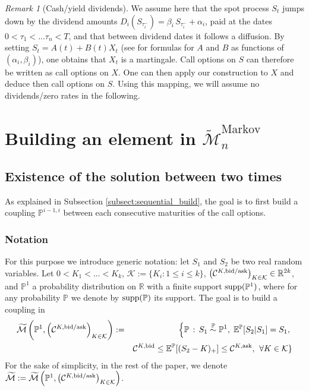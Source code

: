 \documentclass{amsart}%
\def \P{{\mathbb P}}
\def \R{\mathbb{R}}
\def\Cc{{\cal C}}
\def\Kc{{\cal K}}
\def\no{\noindent}
\theoremstyle{definition}
\theoremstyle{remark}
\newtheorem{rem}[thm]{Remark}
\newcommand{\PP}{\mathbb{P}}
\newcommand{\beaa}{\begin{eqnarray*}}
\newcommand{\eeaa}{\end{eqnarray*}}
\newcommand{\EE}{{\mathbb E}}
\newcommand{\cal}{\mathcal}
\begin{document}
\begin{rem}[Cash/yield dividends] \label{div} \no We assume here that the spot process $S_t$ jumps down by the dividend amounts $D_i(S_{\tau_i^-}) = \beta_i \,S_{\tau_i^-}+\alpha_i$, paid at the dates $0 < \tau_1 < \dots \tau_n < T$, and that between dividend dates it follows a diffusion. By setting $S_t=A(t)+B(t)X_t$ (see \cite{henry2009calibration} for formulas for $A$  and $B$ as  functions of $(\alpha_i,\beta_i)$), one obtains that $X_t$ is a martingale.  Call options on $S$ can therefore be written as call options on $X$. One can then apply our construction to $X$  and deduce then call options on $S$. Using this mapping, we will assume no dividends/zero rates in the following.
\end{rem}


\section{Building an element in $\widetilde{\cal M}^\mathrm{Markov}_n$}\label{sect:m-markov}

\subsection{Existence of the solution between two times}

\no As explained in Subsection \ref{subsect:sequential_build}, the goal is to first build a coupling $\P^{i-1,i}$ between each consecutive maturities of the call options.

\subsubsection{Notation}

For this purpose we introduce generic notation: let $S_1$ and $S_2$ be two real random variables. Let $0<K_1<...<K_k$, $\Kc:=\{K_i:1\le i \le k\}$, $\left(\Cc^{K,{\rm bid/ask}}\right)_{K\in\Kc}\in \R^{2k}$, and $\P^1$ a probability distribution on $\R$ with a finite support ${\rm supp}(\P^1)$, where for any probability $\P$ we denote by ${\rm supp}(\P)$ its support. The goal is to build a coupling in
\beaa 
\widetilde{\cal M}\left(\P^1,\left(\Cc^{K,{\rm bid/ask}}\right)_{K\in\Kc}\right)&:=&\left\{\PP \, : \, S_1 \overset{\PP}{\sim} \PP^1,\; \EE^\PP[S_{2}|S_{1}]=S_{1},\right.\\
&&\Cc^{K,\mathrm{bid}} \leq \EE^\PP[(S_{2}-K)_+] \leq \Cc^{K,\mathrm{ask}}, \;\left. \forall K \in {\cal K}\right\}
\eeaa 
For the sake of simplicity, in the rest of the paper, we denote $\widetilde{\cal M}:=\widetilde{\cal M}\left(\P^1,\left(\Cc^{K,{\rm bid/ask}}\right)_{K\in\Kc}\right)$.
\end{document}
